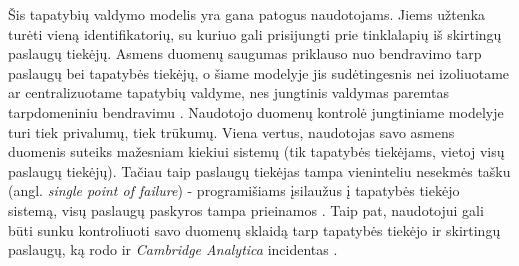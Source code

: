 Šis tapatybių valdymo modelis yra gana patogus naudotojams. Jiems užtenka turėti vieną identifikatorių, su kuriuo
gali prisijungti prie tinklalapių iš skirtingų paslaugų tiekėjų. Asmens duomenų saugumas priklauso nuo
bendravimo tarp paslaugų bei tapatybės tiekėjų, o šiame modelyje jis sudėtingesnis nei izoliuotame ar centralizuotame
tapatybių valdyme, nes jungtinis valdymas paremtas tarpdomeniniu bendravimu \cite{Maler2008}. Naudotojo duomenų kontrolė jungtiniame 
modelyje turi tiek privalumų, tiek trūkumų. Viena vertus, naudotojas savo asmens duomenis suteiks mažesniam kiekiui sistemų (tik tapatybės tiekėjams,
vietoj visų paslaugų tiekėjų). Tačiau taip paslaugų tiekėjas tampa vieninteliu nesekmės tašku (angl. \textit{single point of failure}) - programišiams įsilaužus
į tapatybės tiekėjo sistemą, visų paslaugų paskyros tampa prieinamos \cite{Pashalidis2003}. Taip pat, naudotojui gali būti sunku kontroliuoti
savo duomenų sklaidą tarp tapatybės tiekėjo ir skirtingų paslaugų, ką rodo ir \textit{Cambridge Analytica} incidentas \cite{CambridgeAnalytica}.


\subsection{}